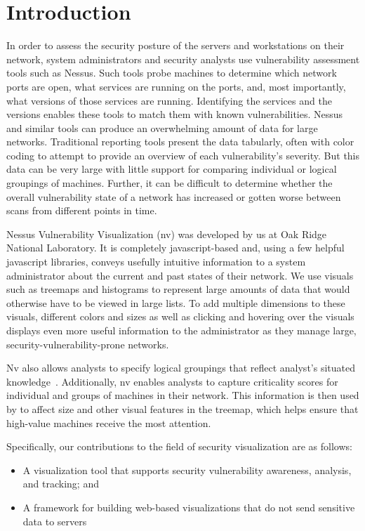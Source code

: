 \documentclass{acm_proc_article-sp}
\begin{document}
\section{Introduction}
In order to assess the security posture of the servers and workstations on their network, system administrators and security analysts use vulnerability assessment tools such as Nessus. 
Such tools probe machines to determine which network ports are open, what services are running on the ports, and, most importantly, what versions of those services are running. 
Identifying the services and the versions enables these tools to match them with known vulnerabilities. 
Nessus and similar tools can produce an overwhelming amount of data for large networks. 
Traditional reporting tools present the data tabularly, often with color coding to attempt to provide an overview of each vulnerability's severity. 
But this data can be very large with little support for comparing individual or logical groupings of machines. 
Further, it can be difficult to determine whether the overall vulnerability state of a network has increased or gotten worse between scans from different points in time.

Nessus Vulnerability Visualization (nv) was developed by us at Oak Ridge National Laboratory. It is completely javascript-based and, using a few helpful javascript libraries, conveys usefully intuitive information to a system administrator about the current and past states of their network. We use visuals such as treemaps and histograms to represent large amounts of data that would otherwise have to be viewed in large lists. To add multiple dimensions to these visuals, different colors and sizes as well as clicking and hovering over the visuals displays even more useful information to the administrator as they manage large, security-vulnerability-prone networks.

Nv also allows analysts to specify logical groupings that reflect analyst's situated knowledge~\cite{Goodall:2004}. Additionally, nv enables analysts to capture criticality scores for individual and groups of machines in their network. This information is then used by to affect size and other visual features in the treemap, which helps ensure that high-value machines receive the most attention.

Specifically, our contributions to the field of security visualization are as follows:

\begin{itemize}
  \item A visualization tool that supports security vulnerability awareness, analysis, and tracking; and
  \item A framework for building web-based visualizations that do not send sensitive data to servers
\end{itemize}
\end{document}
